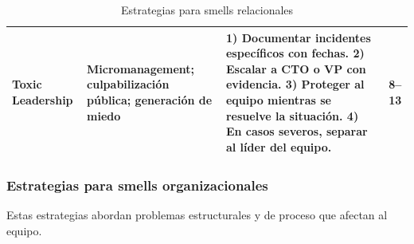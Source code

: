 \begin{table}[h]
\begin{tabularx}{\textwidth}{|l|X|X|c|}
        \hline
        Toxic Leadership
                       & Micromanagement; culpabilización pública; generación de miedo
                       & 1) Documentar incidentes específicos con fechas.
        2) Escalar a CTO o VP con evidencia.
        3) Proteger al equipo mientras se resuelve la situación.
        4) En casos severos, separar al líder del equipo.
                       & 8--13                                                                                                                                    \\
        \hline
    \end{tabularx}
    \caption{Estrategias para smells relacionales}
    \label{tab:estrategias-relacionales}
\end{table}
\FloatBarrier

\subsubsection{Estrategias para smells organizacionales}

Estas estrategias abordan problemas estructurales y de proceso que afectan al equipo.

